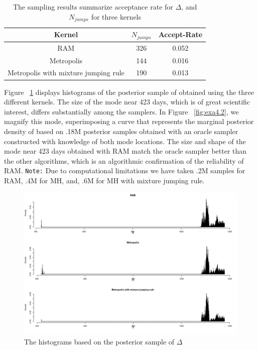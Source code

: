 \documentclass{article}
\begin{document}
\begin{table}[H]
\caption{The sampling results summarize acceptance rate for $\Delta$, and $N_{jumps}$ for three kernels} %
\centering %
\begin{tabular}{c c c } %
\hline\hline %
Kernel & $N_{jumps}$ & Accept-Rate  \\ [0.5ex] %
\hline %
RAM & 326 & 0.052\\
Metropolis & 144 &0.016\\
Metropolis with mixture jumping rule & 190 &0.013\\
\hline %
\end{tabular}
\label{table:nonlin} %
\end{table}
Figure ~\ref{fig:exa4.1} displays histograms of the posterior sample of
 obtained using the three different kernels.
The size of the mode near 423 days, which is of great scientific
interest, differs substantially among the samplers. In Figure ~\ref{fig:exa4.2}, we magnify this mode, superimposing a
curve that represents the marginal posterior density of based
on .18M posterior samples obtained with an oracle
sampler constructed with knowledge of both mode locations.
The size and shape of the mode near 423 days obtained with
RAM match the oracle sampler better than the other algorithms,
which is an algorithmic confirmation of the reliability of RAM. \texttt{Note:} Due to computational limitations we have taken .2M samples for RAM, .4M for MH, and, .6M for MH with mixture jumping rule.
\begin{figure}[!htbp]
    \centering
    \includegraphics[width=\textwidth]{2-4-6(4a).png}
    \caption{The histograms based on the
posterior sample of $\Delta$}
    \label{fig:exa4.1}
\end{figure}
\end{document}

